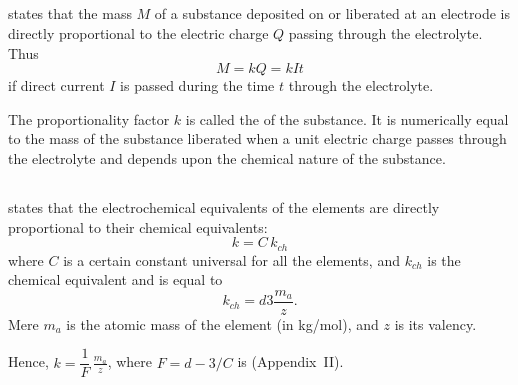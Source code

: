 \subsection{}\label{22.1.2}  states that the mass $M$ of a substance deposited on or liberated at an electrode is directly proportional to the electric charge $Q$ passing through the electrolyte. Thus
\begin{equation*}%
M = kQ = kIt
\end{equation*}
if direct current $I$ is passed during the time $t$ through the electrolyte.

The proportionality factor $k$ is called the  of the substance. It is numerically equal to the mass of the substance liberated when a unit electric charge passes through the electrolyte and depends upon the chemical nature of the substance.

\subsection{}\label{22.1.3}  states that the electrochemical equivalents of the elements are directly proportional to their chemical equivalents:
\begin{equation*}%
k = C \, k_{ch}
\end{equation*}
where $C$ is a certain constant universal for all the elements, and $k_{ch}$ is the chemical equivalent and is equal to
\begin{equation*}%
k_{ch} = \si{d3} \frac{m_{a}}{z}.
\end{equation*}
Mere $m_{a}$ is the atomic mass of the element (in kg/mol), and $z$ is its valency.

Hence, $k = \dfrac{1}{F}\, \frac{m_{a}}{z}$, where $F = \si{d-3}/C$ is  (Appendix~II).

